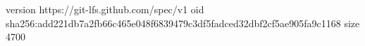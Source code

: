 version https://git-lfs.github.com/spec/v1
oid sha256:add221db7a2fb66c465e048f6839479c3df5fadced32dbf2cf5ae905fa9c1168
size 4700
